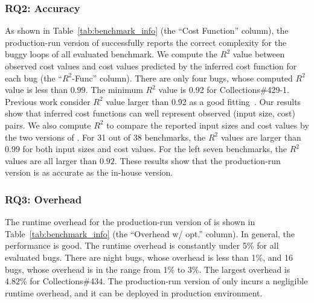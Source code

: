 \subsubsection{RQ2: Accuracy}
As shown in Table~\ref{tab:benchmark_info} (the ``Cost Function'' column),
the production-run version of \Tool successfully 
reports the correct complexity for the buggy loops of 
all evaluated benchmark. 
We compute the $R^2$ value between observed cost values and 
cost values predicted by the inferred cost function for each bug 
(the ``$R^2$-Func'' column).  
There are only four bugs, whose computed $R^2$ value is less than $0.99$.
The minimum $R^2$ value is 0.92 for Collections\#429-1. 
Previous work consider $R^2$ value larger than 0.92 
as a good fitting~\cite{rsquare-value}.
Our results show that inferred cost functions can well represent 
observed (input size, cost) pairs. 
We also compute $R^2$ to compare the reported input sizes 
and cost values by the two versions of \Tool. 
For 31 out of 38 benchmarks, 
the $R^2$ values are larger than $0.99$ for both input sizes and cost values. 
For the left seven benchmarks, the $R^2$ values are all larger than $0.92$. 
These results show that the production-run version is 
as accurate as the in-house version. 


\subsubsection{RQ3: Overhead}
The runtime overhead for the production-run version of \Tool is 
shown in Table~\ref{tab:benchmark_info} (the ``Overhead w/ opt.'' column). 
In general, the performance is good. 
The runtime overhead is constantly 
under 5\% for all evaluated bugs. 
There are night bugs, whose overhead is less than 1\%, 
and 16 bugs, whose overhead is in the range from 1\% to 3\%.  
The largest overhead is 4.82\% for Collections\#434. 
The production-run version of \Tool only incurs a negligible runtime overhead, 
and it can be deployed in production environment.  


